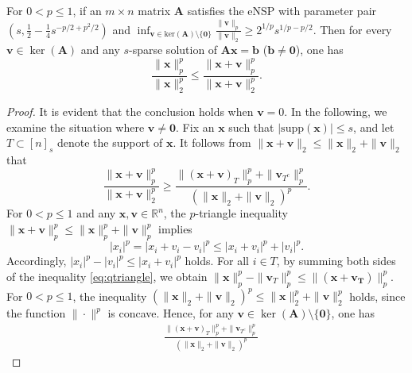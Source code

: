 \documentclass[10pt,a4paper]{amsart}
\begin{document}
\begin{theorem}\label{thm:local_minimality}
	For $0 < p \le 1$, if an $ m \times n $ matrix $ \bm{A} $ satisfies the eNSP with parameter pair $\left(s, \frac{1}{2}-\frac{1}{4}s^{-p/2+p^2/2}\right) $ and 
	$\inf_{\bm{v}\in\text{ker}(\bm{A})\setminus\{\bm{0}\}}\frac{\|\bm{v}\|_{p}}{\|\bm{v}\|_{2}} \ge 2^{1/p}s^{1/p-p/2}.$ Then for every $ \bm{v} \in \ker(\bm{A}) $ and any $ s $-sparse solution of $ \bm{A}\bm{x} = \bm{b} $ ($ \bm{b} \neq \bm{0} $), one has
	\begin{equation}
		\frac{\|\bm{x}\|_{p}^{p}}{\|\bm{x}\|_{2}^{p}} \leq \frac{\|\bm{x} + \bm{v}\|_{p}^{p}}{\|\bm{x} + \bm{v}\|_{2}^{p}}.
	\end{equation}
\end{theorem}

\begin{proof}
	It is evident that the conclusion holds when $\bm{v} = 0$. In the following, we examine the situation where $\bm{v} \neq \bm{0}$. Fix an $\bm{x}$ such that $|\text{supp}\left(\bm{x}\right)| \leq s$, and let $T \subset [n]_s$ denote the support of $\bm{x}$. It follows from $\|\bm{x} + \bm{v}\|_2 \leq \|\bm{x}\|_2 + \|\bm{v}\|_2$ that
	\begin{equation}
		\frac{\|\bm{x} + \bm{v}\|_p^p}{\|\bm{x} + \bm{v}\|_2^p}
		\geq \frac{\|(\bm{x} + \bm{v})_T\|_p^p + \|\bm{v}_{T^c}\|_p^p}{(\|\bm{x}\|_2 + \|\bm{v}\|_2)^p}.
	\end{equation}
	For $0 < p \le 1$ and any $\bm{x}, \bm{v} \in \mathbb{R}^n $, the $p$-triangle inequality $ \|\bm{x} + \bm{v}\|_p^p \leq \|\bm{x}\|_p^p + \|\bm{v}\|_p^p$ implies 
	\begin{equation}\label{eq:qtriangle}
		\left | x_i\right |^p = \left | x_i+v_i-v_i\right |^p \le \left |x_i+v_i\right |^p + \left |v_i\right |^p.     
	\end{equation}
	Accordingly, $\left | x_i\right |^p - \left |v_i\right |^p \le \left | x_i+v_i\right |^p $ holds. For all $i \in T$, by summing both sides of the inequality \cref{eq:qtriangle}, we obtain $\|\bm{x}\|_p^p - \|\bm{v}_{T}\|_p^p \leq \|\left(\bm{x} + \bm{v_{T}}\right)\|_p^p$. For $0 < p \le 1$, the inequality $(\|\bm{x}\|_2 + \|\bm{v}\|_2)^p \le \|\bm{x}\|_2^p + \|\bm{v}\|_2^p$ holds, since the function $\|\cdot\|^p$ is concave. Hence, for any $ \bm{v} \in \ker(\bm{A}) \setminus \{\bm{0}\} $, one has
	\begin{equation}
		\begin{aligned}
			&\frac{\|(\bm{x} + \bm{v})_T\|_p^p + \|\bm{v}_{T^c}\|_p^p}{(\|\bm{x}\|_2 + \|\bm{v}\|_2)^p}

\end{aligned}
\end{equation}
\end{proof}
\end{document}
